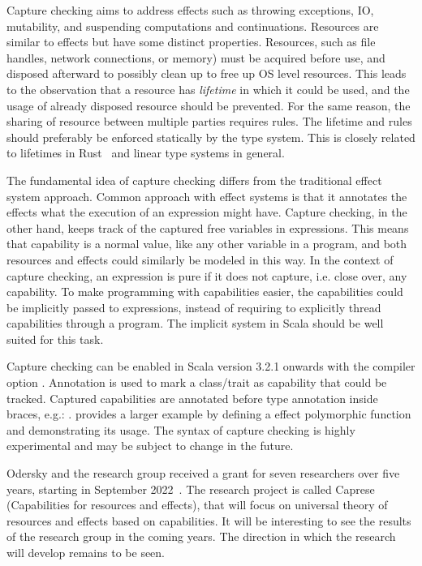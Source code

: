 Capture checking aims to address effects such as throwing exceptions, IO, mutability, and suspending computations and continuations. Resources are similar to effects but have some distinct properties. Resources, such as file handles, network connections, or memory) must be acquired before use, and disposed afterward to possibly clean up to free up OS level resources. This leads to the observation that a resource has \textit{lifetime} in which it could be used, and the usage of already disposed resource should be prevented. For the same reason, the sharing of resource between multiple parties requires rules. The lifetime and rules should preferably be enforced statically by the type system. This is closely related to lifetimes in Rust~\cite{rust-lifetimes} and linear type systems in general.

The fundamental idea of capture checking differs from the traditional effect system approach. Common approach with effect systems is that it annotates the effects what the execution of an expression might have. Capture checking, in the other hand, keeps track of the captured free variables in expressions. This means that capability is a normal value, like any other variable in a program, and both resources and effects could similarly be modeled in this way. In the context of capture checking, an expression is pure if it does not capture, i.e. close over, any capability. To make programming with capabilities easier, the capabilities could be implicitly passed to expressions, instead of requiring to explicitly thread capabilities through a program. The implicit system in Scala should be well suited for this task.

Capture checking can be enabled in Scala version 3.2.1 onwards with the compiler option . Annotation  is used to mark a class/trait as capability that could be tracked. Captured capabilities are annotated before type annotation inside braces, e.g.: .  provides a larger example by defining a effect polymorphic  function and demonstrating its usage. The syntax of capture checking is highly experimental and may be subject to change in the future.



Odersky and the research group received a grant for seven researchers over five years, starting in September 2022~\cite{capture-checking-grant}. The research project is called Caprese (Capabilities for resources and effects), that will focus on universal theory of resources and effects based on capabilities. It will be interesting to see the results of the research group in the coming years.  The direction in which the research will develop remains to be seen.



